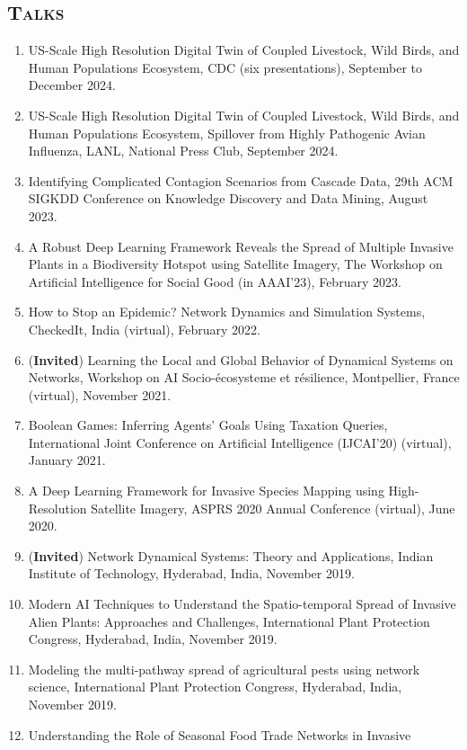 \documentclass[margin,10pt]{res} %
\begin{document}
\begin{resume}
{\section{\textnormal{\textsc{Talks}}} 
\begin{enumerate}[1.]
\item US-Scale High Resolution Digital Twin of Coupled Livestock, Wild
Birds, and Human Populations Ecosystem, CDC (six presentations), September
to December 2024.
\item US-Scale High Resolution Digital Twin of Coupled Livestock, Wild
Birds, and Human Populations Ecosystem, Spillover from Highly Pathogenic
Avian Influenza, LANL, National Press Club, September 2024.
\item Identifying Complicated Contagion Scenarios from Cascade Data, 29th
ACM SIGKDD Conference on Knowledge Discovery and Data Mining, August
2023.
\item A Robust Deep Learning Framework Reveals the Spread of Multiple
Invasive Plants in a Biodiversity Hotspot using Satellite Imagery, The
Workshop on Artificial Intelligence for Social Good (in AAAI'23), February
2023.
\item How to Stop an Epidemic? Network Dynamics and Simulation Systems,
CheckedIt, India (virtual), February 2022.
\item (\textbf{Invited}) Learning the Local and Global Behavior of
Dynamical Systems on Networks, Workshop on AI Socio-\'{e}cosysteme et
r\'{e}silience, Montpellier, France (virtual), November 2021.
\item Boolean Games: Inferring Agents' Goals Using Taxation Queries,
International Joint Conference on Artificial Intelligence (IJCAI'20)
(virtual), January 2021.
\item A Deep Learning Framework for Invasive Species Mapping using
High-Resolution Satellite Imagery, ASPRS 2020 Annual Conference (virtual), June 2020.
\item (\textbf{Invited}) Network Dynamical Systems: Theory and
Applications, Indian Institute of Technology, Hyderabad, India,
November 2019.
\item Modern AI Techniques to Understand the Spatio-temporal Spread of
Invasive Alien Plants: Approaches and Challenges, International Plant
Protection Congress, Hyderabad, India, November 2019.
\item Modeling the multi-pathway spread of agricultural pests using
network science, International Plant Protection Congress, Hyderabad,
India, November 2019.
\item Understanding the Role of Seasonal Food Trade Networks in Invasive

\end{enumerate}}
\end{resume}
\end{document}
